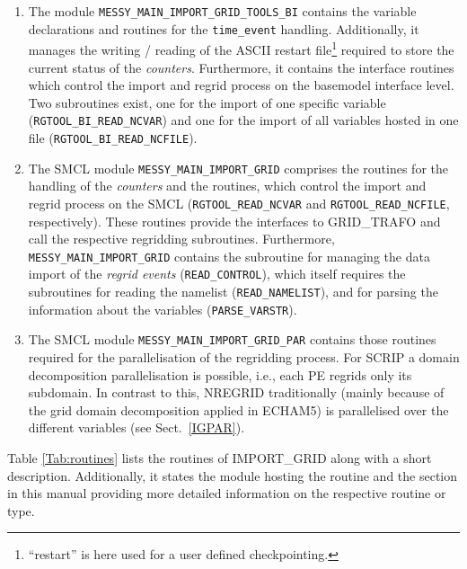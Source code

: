 \documentclass[11pt,twoside]{report}
\begin{document}
\begin{enumerate}
\item The module \verb|MESSY_MAIN_IMPORT_GRID_TOOLS_BI| contains the
variable declarations and routines for the {\tt time\_event}
handling. Additionally, it manages the writing / reading of the
ASCII restart file\footnote{``restart'' is here used for a user defined
checkpointing.} required to store the current status of the 
{\it counters}.
 Furthermore, it contains the interface routines which control
the import and regrid process on the basemodel interface level.
Two subroutines exist, one for the import of one specific variable
(\verb|RGTOOL_BI_READ_NCVAR|) and
one for the import of all variables hosted in one file
(\verb|RGTOOL_BI_READ_NCFILE|). 
\item The SMCL module \verb|MESSY_MAIN_IMPORT_GRID| comprises the
routines for the handling of the {\it counters} and the routines, which control
the import and regrid process on the SMCL
(\verb|RGTOOL_READ_NCVAR| and \verb|RGTOOL_READ_NCFILE|,
respectively). These routines provide the interfaces to GRID\_TRAFO
and call the respective regridding
subroutines. Furthermore, \verb|MESSY_MAIN_IMPORT_GRID|
contains the subroutine for managing the data import of the  
{\it regrid events}
(\verb|READ_CONTROL|), which itself requires the subroutines for reading the 
namelist (\verb|READ_NAMELIST|), and for parsing the information about the
variables (\verb|PARSE_VARSTR|). \label{IGPARSE}
\item The SMCL module \verb|MESSY_MAIN_IMPORT_GRID_PAR| contains
those routines required for the parallelisation of the regridding
process. For SCRIP a domain decomposition parallelisation is possible, 
i.e., each PE regrids only its subdomain.
In contrast to this, NREGRID traditionally (mainly because of the grid 
domain decomposition applied in ECHAM5) is parallelised over the
different variables (see Sect.~\ref{IGPAR}). 
\end{enumerate}
Table \ref{Tab:routines} lists the routines of IMPORT\_GRID along with
a short description. Additionally, it states the module hosting
the routine and the section in this manual providing more detailed
information on the respective routine or type.

\end{document}
